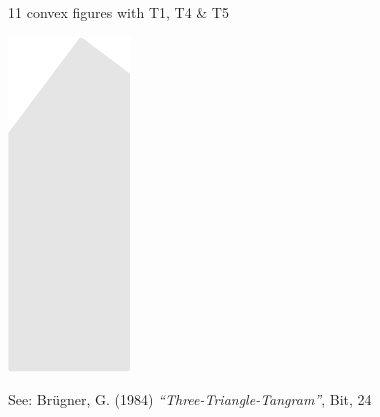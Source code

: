 \documentclass[14pt]{beamer}
\begin{document}
\begin{frame}{11 convex figures with T1, T4 \& T5}
\begin{center}
            \includegraphics[scale=0.39]{figures/figure004k.pdf}\\

            \bigskip\medskip

            {\footnotesize See: Brügner, G. (1984) \emph{``Three-Triangle-Tangram''}, Bit, 24}
        \end{center}
    \end{frame}

\end{document}
